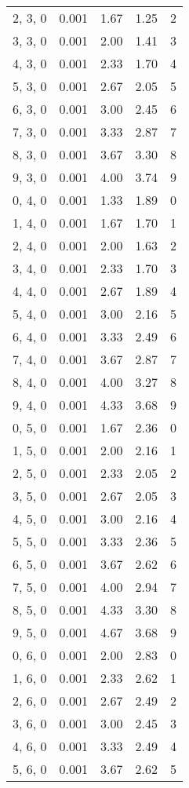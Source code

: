 \documentclass[12pt]{article}
\begin{document}
\begin{tabular}{c || c || c | c | c}
2, 3, 0 & 0.001 & 1.67 & 1.25 & 2 \\
3, 3, 0 & 0.001 & 2.00 & 1.41 & 3 \\
4, 3, 0 & 0.001 & 2.33 & 1.70 & 4 \\
5, 3, 0 & 0.001 & 2.67 & 2.05 & 5 \\
6, 3, 0 & 0.001 & 3.00 & 2.45 & 6 \\
7, 3, 0 & 0.001 & 3.33 & 2.87 & 7 \\
8, 3, 0 & 0.001 & 3.67 & 3.30 & 8 \\
9, 3, 0 & 0.001 & 4.00 & 3.74 & 9 \\
0, 4, 0 & 0.001 & 1.33 & 1.89 & 0 \\
1, 4, 0 & 0.001 & 1.67 & 1.70 & 1 \\
2, 4, 0 & 0.001 & 2.00 & 1.63 & 2 \\
3, 4, 0 & 0.001 & 2.33 & 1.70 & 3 \\
4, 4, 0 & 0.001 & 2.67 & 1.89 & 4 \\
5, 4, 0 & 0.001 & 3.00 & 2.16 & 5 \\
6, 4, 0 & 0.001 & 3.33 & 2.49 & 6 \\
7, 4, 0 & 0.001 & 3.67 & 2.87 & 7 \\
8, 4, 0 & 0.001 & 4.00 & 3.27 & 8 \\
9, 4, 0 & 0.001 & 4.33 & 3.68 & 9 \\
0, 5, 0 & 0.001 & 1.67 & 2.36 & 0 \\
1, 5, 0 & 0.001 & 2.00 & 2.16 & 1 \\
2, 5, 0 & 0.001 & 2.33 & 2.05 & 2 \\
3, 5, 0 & 0.001 & 2.67 & 2.05 & 3 \\
4, 5, 0 & 0.001 & 3.00 & 2.16 & 4 \\
5, 5, 0 & 0.001 & 3.33 & 2.36 & 5 \\
6, 5, 0 & 0.001 & 3.67 & 2.62 & 6 \\
7, 5, 0 & 0.001 & 4.00 & 2.94 & 7 \\
8, 5, 0 & 0.001 & 4.33 & 3.30 & 8 \\
9, 5, 0 & 0.001 & 4.67 & 3.68 & 9 \\
0, 6, 0 & 0.001 & 2.00 & 2.83 & 0 \\
1, 6, 0 & 0.001 & 2.33 & 2.62 & 1 \\
2, 6, 0 & 0.001 & 2.67 & 2.49 & 2 \\
3, 6, 0 & 0.001 & 3.00 & 2.45 & 3 \\
4, 6, 0 & 0.001 & 3.33 & 2.49 & 4 \\
5, 6, 0 & 0.001 & 3.67 & 2.62 & 5 \\

\end{tabular}
\end{document}
